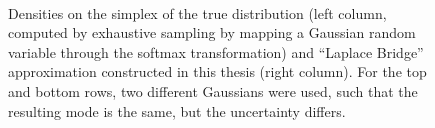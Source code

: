\begin{figure}[htb]
     \centering

    \setcounter{subfigure}{0}

      \\
     \caption{Densities on the simplex of the true distribution (left column, computed by exhaustive sampling by mapping a Gaussian random variable through the softmax transformation) and ``Laplace Bridge'' approximation constructed in this thesis (right column). For the top and bottom rows, two different Gaussians were used, such that the resulting mode is the same, but the uncertainty differs.}
    \label{fig:LPbridge_sMAP}
\end{figure}
	
